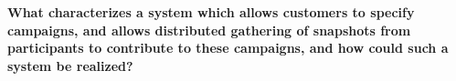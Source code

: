 
\textbf{What characterizes a system which allows customers to specify campaigns, and allows distributed gathering of snapshots from participants to contribute to these campaigns, and how could such a system be realized?}